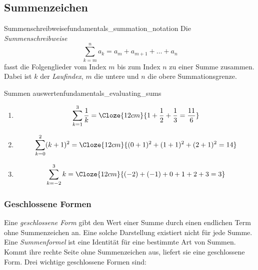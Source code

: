 \subsection{Summenzeichen}
\label{subsec:fundamentals_summation_notation}

\begin{DefinitionBox}{Summenschreibweise}{fundamentals_summation_notation}
  Die \emph{Summenschreibweise} 
  \[
    \sum_{k=m}^{n}a_k
      =a_m+a_{m+1}+\dots+a_n
  \]
  fasst die Folgenglieder vom Index $m$ bis zum Index $n$ zu einer Summe
  zusammen. Dabei ist $k$ der \emph{Laufindex}, $m$ die untere und $n$ die
  obere Summationsgrenze.
\end{DefinitionBox}

\begin{ExampleBox}{Summen auswerten}{fundamentals_evaluating_sums}
  \begin{enumerate}[label=(\alph*),leftmargin=2em,itemsep=0.8em]
    \item\leavevmode
      \[
        \sum_{k=1}^{3}\frac1k
          =\Cloze{12cm}{1+\frac12+\frac13=\frac{11}{6}}
      \]
    \item\leavevmode
      \[
        \sum_{k=0}^{2}(k+1)^2
          =\Cloze{12cm}{(0+1)^2+(1+1)^2+(2+1)^2=14}
      \]
    \item\leavevmode
      \[
        \sum_{k=-2}^{3}k
          =\Cloze{12cm}{(-2)+(-1)+0+1+2+3=3}
      \]
  \end{enumerate}
\end{ExampleBox}



\subsubsection{Geschlossene Formen}
\label{subsubsec:fundamentals_closed_forms}

Eine \emph{geschlossene Form} gibt den Wert einer Summe durch einen endlichen
Term ohne Summenzeichen an. Eine solche Darstellung existiert nicht für jede
Summe. Eine \emph{Summenformel} ist eine Identität für eine bestimmte Art von
Summen. Kommt ihre rechte Seite ohne Summenzeichen aus, liefert sie eine
geschlossene Form. Drei wichtige geschlossene Formen sind:

